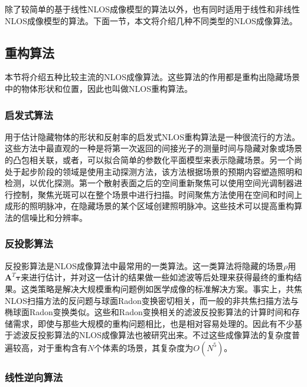 \documentclass[master]{shtthesis}             %
\begin{document}
除了较简单的基于线性NLOS成像模型的算法以外，也有同时适用于线性和非线性NLOS成像模型的算法。下面一节，本文将介绍几种不同类型的NLOS成像算法。

\subsection{重构算法}

本节将介绍五种比较主流的NLOS成像算法。这些算法的作用都是重构出隐藏场景中的物体形状和位置，因此也叫做NLOS重构算法。

\subsubsection{启发式算法}

用于估计隐藏物体的形状和反射率的启发式NLOS重构算法是一种很流行的方法。这些方法中最直观的一种是将第一次返回的间接光子的测量时间与隐藏对象或场景的凸包相关联\citep{Tsai2017}，或者，可以拟合简单的参数化平面模型来表示隐藏场景\citep{Pediredla2017}。另一个尚处于起步阶段的领域是使用主动探测方法，该方法根据场景的预期内容塑造照明和检测，以优化探测。第一个散射表面之后的空间重新聚焦可以使用空间光调制器进行控制，聚焦光斑可以在整个场景中进行扫描\citep{starshynov2019coherent}。时间聚焦方法使用在空间和时间上成形的照明脉冲，在隐藏场景的某个区域创建照明脉冲\citep{pediredla2019snlos}。这些技术可以提高重构算法的信噪比和分辨率。

\subsubsection{反投影算法}

反投影算法是NLOS成像算法中最常用的一类算法。这一类算法将隐藏的场景$\rho$用$\mathbf{A}^T\mathbf{\tau}$来进行估计，并对这一估计的结果做一些如滤波等后处理来获得最终的重构结果。这类策略是解决大规模重构问题例如医学成像的标准解决方案。事实上，共焦NLOS扫描方法的反问题与球面Radon变换密切相关\citep{tasinkevych2014circular}，而一般的非共焦扫描方法与椭球面Radon变换类似\citep{moon2014determination}。这些和Radon变换相关的滤波反投影算法的计算时间和存储需求，即使与那些大规模的重构问题相比，也是相对容易处理的。因此有不少基于滤波反投影算法的NLOS成像算法也被研究出来\citep{Velten2012,gupta2012reconstruction,buttafava2014time,Laurenzis2014,Arellano2017}。不过这些成像算法的复杂度普遍较高，对于重构含有$N$个体素的场景，其复杂度为$O(N^5)$。

\subsubsection{线性逆向算法}
\end{document}
